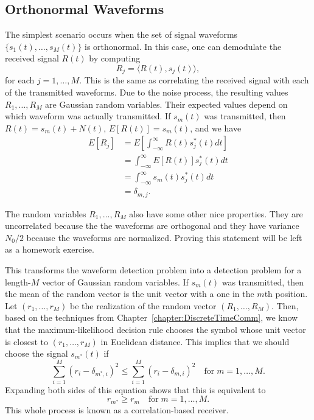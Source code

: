 \subsection{Orthonormal Waveforms}
The simplest scenario occurs when the set of signal waveforms $\{ s_1 (t), \ldots , s_M (t) \}$ is orthonormal.
In this case, one can demodulate the received signal $R(t)$ by computing
\[ R_j = \langle R(t), s_j (t) \rangle, \]
for each $j=1,\ldots,M$.
This is the same as correlating the received signal with each of the transmitted waveforms.
Due to the noise process, the resulting values $R_1 , \ldots, R_M$ are Gaussian random variables.
Their expected values depend on which waveform was actually transmitted.
If $s_m (t)$ was transmitted, then $R(t) = s_m(t) + N(t)$, $E[R(t)] = s_m(t)$, and we have
\begin{align*}
E \left[R_j \right]
&= E \left[ \int_{-\infty}^{\infty} R(t) s_j^* (t) dt \right] \\
&= \int_{-\infty}^{\infty} E \left[ R(t) \right] s_j^* (t) dt \\
&= \int_{-\infty}^{\infty} s_m (t) s_j^* (t) dt \\
&= \delta_{m,j}.
\end{align*}

The random variables $R_1, \ldots , R_M$ also have some other nice properties.
They are uncorrelated because the the waveforms are orthogonal and they have variance $N_0  / 2$ because the waveforms are normalized.
Proving this statement will be left as a homework exercise.

This transforms the waveform detection problem into a detection problem for a length-$M$ vector of Gaussian random variables.
If $s_m (t)$ was transmitted, then the mean of the random vector is the unit vector with a one in the $m$th position.
Let $(r_1, \ldots, r_M)$ be the realization of the random vector $(R_1,\ldots,R_M)$.
Then, based on the techniques from Chapter~\ref{chapter:DiscreteTimeComm}, we know that the maximum-likelihood decision rule chooses the symbol whose unit vector is closest to $(r_1,\ldots,r_M)$ in Euclidean distance.
This implies that we should choose the signal $s_{m^*}(t)$ if
\[ \sum_{i=1}^M (r_i - \delta_{m^*,i})^2 \leq \sum_{i=1}^M (r_i - \delta_{m,i})^2 \quad \mathrm{for}\; m=1,\ldots,M. \]
Expanding both sides of this equation shows that this is equivalent to
\[ r_{m^*} \geq r_m \quad \mathrm{for}\; m=1,\ldots,M. \]
This whole process is known as a correlation-based receiver.


